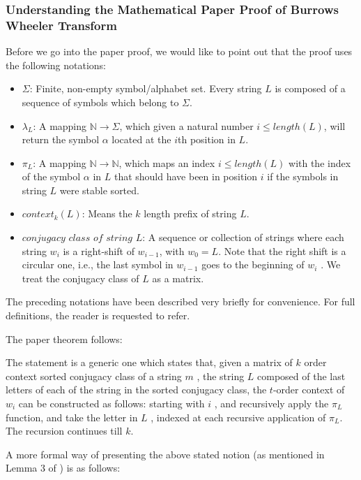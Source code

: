 \documentclass[11pt,letterpaper,titlepage]{article}
\begin{document}
\subsubsection{Understanding the Mathematical Paper Proof of Burrows Wheeler
Transform}

Before we go into the paper proof, we would like to point out that the proof
uses the following notations:

\begin{itemize}
    \item $\Sigma$: Finite, non-empty symbol/alphabet set. Every string $L$ is
        composed of a sequence of symbols which belong to $\Sigma$.
    \item $\lambda_L$: A mapping $\mathbb{N}\rightarrow\Sigma$, which given a
        natural number $i \leq length(L)$, will return the symbol $\alpha$
        located at the $i$th position in $L$.
    \item $\pi_L$: A mapping $\mathbb{N}\rightarrow\mathbb{N}$, which maps an
        index $i \leq length(L)$ with the index of the symbol $\alpha$ in $L$
        that should have been in position $i$ if the symbols in string $L$ were
        stable sorted.
    \item $context_k(L)$: Means the $k$ length prefix of string $L$.
    \item $\textit{conjugacy class of string }L$: A sequence or collection of
        strings where each string $w_i$ is a right-shift of $w_{i-1}$, with
        $w_0 = L$. Note that the right shift is a circular one, i.e., the last
        symbol in $w_{i-1}$ goes to the beginning of $w_i$ . We treat the
        conjugacy class of $L$ as a matrix.
\end{itemize}

The preceding notations have been described very briefly for convenience. For
full definitions, the reader is requested to refer\cite{kufleitner2009on}.

The paper theorem follows:

The statement is a generic one which states that, given a matrix of $k$ order
context sorted conjugacy class of a string $m$ , the string $L$ composed of the
last letters of each of the string in the sorted conjugacy class, the $t$-order
context of $w_i$ can be constructed as follows: starting with $i$ , and
recursively apply the $\pi_L$ function, and take the letter in $L$ , indexed at
each recursive application of $\pi_L$. The recursion continues till $k$.

A more formal way of presenting the above stated notion (as mentioned in Lemma
3 of \cite{kufleitner2009on}) is as follows:
\end{document}
